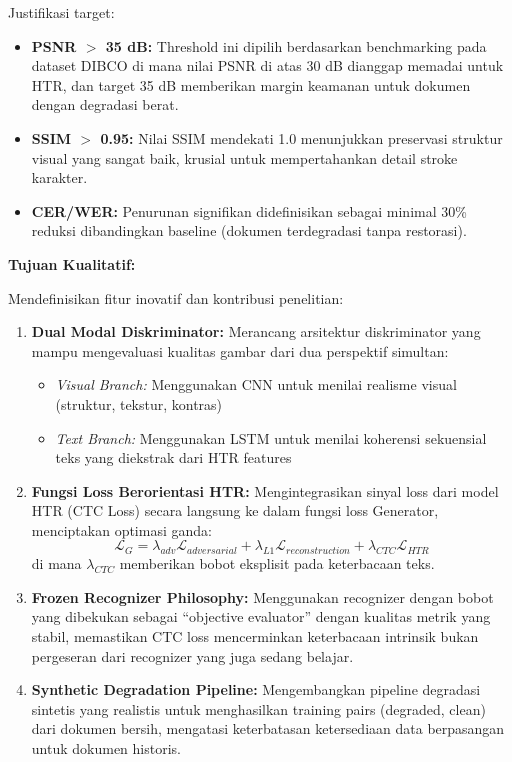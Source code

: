\documentclass[12pt,a4paper]{article}
\begin{document}
Justifikasi target:
\begin{itemize}[leftmargin=*, nosep]
\item \textbf{PSNR $>$ 35 dB:} Threshold ini dipilih berdasarkan benchmarking pada dataset DIBCO di mana nilai PSNR di atas 30 dB dianggap memadai untuk HTR, dan target 35 dB memberikan margin keamanan untuk dokumen dengan degradasi berat.
\item \textbf{SSIM $>$ 0.95:} Nilai SSIM mendekati 1.0 menunjukkan preservasi struktur visual yang sangat baik, krusial untuk mempertahankan detail stroke karakter.
\item \textbf{CER/WER:} Penurunan signifikan didefinisikan sebagai minimal 30\% reduksi dibandingkan baseline (dokumen terdegradasi tanpa restorasi).
\end{itemize}
\vspace{1em}
\textbf{Tujuan Kualitatif:}

Mendefinisikan fitur inovatif dan kontribusi penelitian:

\begin{enumerate}[leftmargin=*, nosep]
\item \textbf{Dual Modal Diskriminator:} Merancang arsitektur diskriminator yang mampu mengevaluasi kualitas gambar dari dua perspektif simultan:
\begin{itemize}[nosep]
\item \textit{Visual Branch:} Menggunakan CNN untuk menilai realisme visual (struktur, tekstur, kontras)
\item \textit{Text Branch:} Menggunakan LSTM untuk menilai koherensi sekuensial teks yang diekstrak dari HTR features
\end{itemize}

\item \textbf{Fungsi Loss Berorientasi HTR:} Mengintegrasikan sinyal loss dari model HTR (CTC Loss) secara langsung ke dalam fungsi loss Generator, menciptakan optimasi ganda:
\begin{equation}
\mathcal{L}_G = \lambda_{adv} \mathcal{L}_{adversarial} + \lambda_{L1} \mathcal{L}_{reconstruction} + \lambda_{CTC} \mathcal{L}_{HTR}
\end{equation}
di mana $\lambda_{CTC}$ memberikan bobot eksplisit pada keterbacaan teks.

\item \textbf{Frozen Recognizer Philosophy:} Menggunakan recognizer dengan bobot yang dibekukan sebagai ``objective evaluator'' dengan kualitas metrik yang stabil, memastikan CTC loss mencerminkan keterbacaan intrinsik bukan pergeseran dari recognizer yang juga sedang belajar.

\item \textbf{Synthetic Degradation Pipeline:} Mengembangkan pipeline degradasi sintetis yang realistis untuk menghasilkan training pairs (degraded, clean) dari dokumen bersih, mengatasi keterbatasan ketersediaan data berpasangan untuk dokumen historis.
\end{enumerate}
\end{document}

